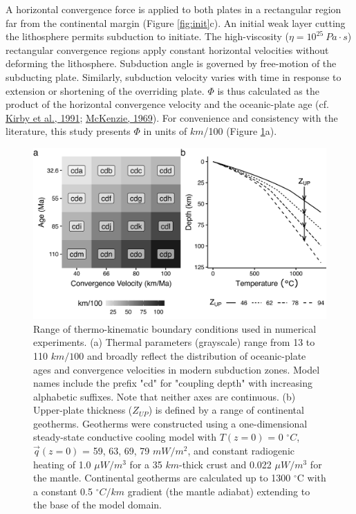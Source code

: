 A horizontal convergence force is applied to both plates in a rectangular region far from the continental margin (Figure \ref{fig:init}c). An initial weak layer cutting the lithosphere permits subduction to initiate. The high-viscosity (\(\eta = 10^{25}~Pa\cdot s\)) rectangular convergence regions apply constant horizontal velocities without deforming the lithosphere. Subduction angle is governed by free-motion of the subducting plate. Similarly, subduction velocity varies with time in response to extension or shortening of the overriding plate. \(\Phi\) is thus calculated as the product of the horizontal convergence velocity and the oceanic-plate age (cf. \protect\hyperlink{ref-kirby1991}{Kirby et al., 1991}; \protect\hyperlink{ref-mckenzie1969}{McKenzie, 1969}). For convenience and consistency with the literature, this study presents \(\Phi\) in units of \(km\)/100 (Figure \ref{fig:params}a).

\begin{figure}[htbp]

{\centering \includegraphics[width=1\linewidth,]{assets/figs/chpt2/fig2} 

}

\caption[Range of boundary conditions used in numerical experiments]{Range of thermo-kinematic boundary conditions used in numerical experiments. (a) Thermal parameters (grayscale) range from 13 to 110 $km/100$ and broadly reflect the distribution of oceanic-plate ages and convergence velocities in modern subduction zones. Model names include the prefix "cd" for "coupling depth" with increasing alphabetic suffixes. Note that neither axes are continuous. (b) Upper-plate thickness ($Z_{UP}$) is defined by a range of continental geotherms. Geotherms were constructed using a one-dimensional steady-state conductive cooling model with $T(z=0)$ = 0 $^{\circ}C$, $\vec{q}(z=0)$ = 59, 63, 69, 79 $mW/m^2$, and constant radiogenic heating of 1.0 $\mu W/m^3$ for a 35 $km$-thick crust and 0.022 $\mu W/m^3$ for the mantle. Continental geotherms are calculated up to 1300 $^{\circ}$C with a constant 0.5 $^{\circ}C/km$ gradient (the mantle adiabat) extending to the base of the model domain.}\label{fig:params}
\end{figure}

